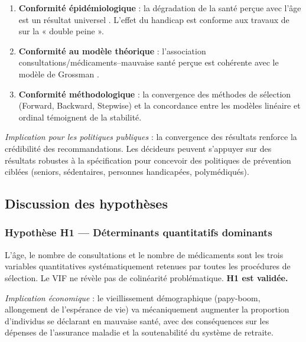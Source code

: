 \documentclass[11pt,a4paper]{memoirerecherche}
\providecommand{\tightlist}{%
  \setlength{\itemsep}{0pt}\setlength{\parskip}{0pt}}
\begin{document}
\begin{enumerate}
\def\labelenumi{\arabic{enumi}.}
\tightlist
\item
  \textbf{Conformité épidémiologique} : la dégradation de la santé perçue avec l'âge est un résultat universel \autocite{mackenbach1999}. L'effet du handicap est conforme aux travaux de \textcite{cambois2008} sur la « double peine ».
\item
  \textbf{Conformité au modèle théorique} : l'association consultations/médicaments--mauvaise santé perçue est cohérente avec le modèle de Grossman \autocite{grossman1972}.
\item
  \textbf{Conformité méthodologique} : la convergence des méthodes de sélection (Forward, Backward, Stepwise) et la concordance entre les modèles linéaire et ordinal témoignent de la stabilité.
\end{enumerate}

\emph{Implication pour les politiques publiques} : la convergence des résultats renforce la crédibilité des recommandations. Les décideurs peuvent s'appuyer sur des résultats robustes à la spécification pour concevoir des politiques de prévention ciblées (seniors, sédentaires, personnes handicapées, polymédiqués).

\hypertarget{discussion-des-hypothuxe8ses}{%
\subsection{Discussion des hypothèses}\label{discussion-des-hypothuxe8ses}}

\hypertarget{hypothuxe8se-h1-duxe9terminants-quantitatifs-dominants}{%
\subsubsection{Hypothèse H1 --- Déterminants quantitatifs dominants}\label{hypothuxe8se-h1-duxe9terminants-quantitatifs-dominants}}

L'âge, le nombre de consultations et le nombre de médicaments sont les trois variables quantitatives systématiquement retenues par toutes les procédures de sélection. Le VIF ne révèle pas de colinéarité problématique. \textbf{H1 est validée.}

\emph{Implication économique} : le vieillissement démographique (papy-boom, allongement de l'espérance de vie) va mécaniquement augmenter la proportion d'individus se déclarant en mauvaise santé, avec des conséquences sur les dépenses de l'assurance maladie et la soutenabilité du système de retraite.
\end{document}

